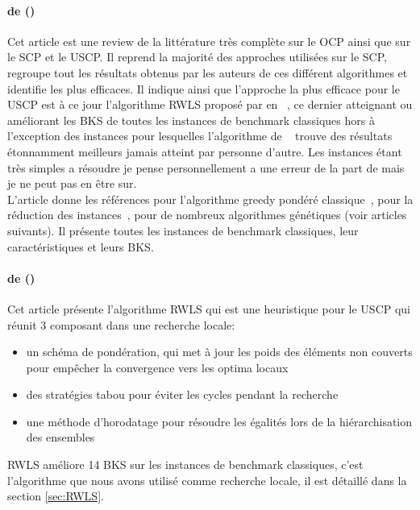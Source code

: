 \documentclass[a4paper,11pt,twoside,french,report]{../common/simplem}
\begin{document}
				\paragraph*{ de \citeauthor{Kritter2019} (\citeyear{Kritter2019})~\cite{Kritter2019}\\}
					Cet article est une review de la littérature très complète sur le \gls{OCP} ainsi que sur le \gls{SCP} et le \gls{USCP}. Il reprend la majorité des approches utilisées sur le \gls{SCP}, regroupe tout les résultats obtenus par les auteurs de ces différent algorithmes et identifie les plus efficaces. Il indique ainsi que l'approche la plus efficace pour le \gls{USCP} est à ce jour l'algorithme \gls{RWLS} proposé par \citeauthor{Gao2015} en \citeyear{Gao2015}~\cite{Gao2015}, ce dernier atteignant ou améliorant les \gls{BKS} de toutes les instances de benchmark classiques hors  à l'exception des instances  pour lesquelles l'algorithme de \citeauthor{Akhter2015}~\cite{Akhter2015} trouve des résultats étonnamment meilleurs jamais atteint par personne d'autre. Les instances  étant très simples a résoudre je pense personnellement a une erreur de la part de \citeauthor{Akhter2015} mais je ne peut pas en être sur.\\
					L'article donne les références pour l'algorithme greedy pondéré classique~\cite{Chvatal1979}, pour la réduction des instances~\cite{Beasley1987}, pour de nombreux algorithmes génétiques (voir articles suivants). Il présente toutes les instances de benchmark classiques, leur caractéristiques et leurs \gls{BKS}.
				\paragraph*{ de \citeauthor{Gao2015} (\citeyear{Gao2015})~\cite{Gao2015}\\}
					Cet article présente l'algorithme \acrfull{RWLS} qui est une heuristique pour le \gls{USCP} qui réunit 3 composant dans une recherche locale:
					\begin{itemize}
						\item un schéma de pondération, qui met à jour les poids des éléments non couverts pour empêcher la convergence vers les optima locaux
						\item des stratégies tabou pour éviter les cycles pendant la recherche
						\item une méthode d'horodatage pour résoudre les égalités lors de la hiérarchisation des ensembles
					\end{itemize}
					\gls{RWLS} améliore 14 \gls{BKS} sur les instances de benchmark classiques, c'est l'algorithme que nous avons utilisé comme recherche locale, il est détaillé dans la section \ref{sec:RWLS}.
\end{document}
